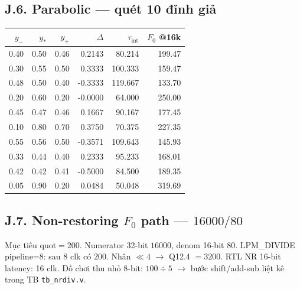 \subsection*{J.6. Parabolic --- quét 10 đỉnh giả}
\begin{center}\scriptsize
\begin{tabular}{@{}rrrrrr@{}}
\toprule
$y_-$ & $y_*$ & $y_+$ & $\Delta$ & $\tau_{\mathrm{int}}$ & $F_0$ @16k \\
\midrule
0.40 & 0.50 & 0.46 & 0.2143 & 80.214 & 199.47 \\
0.30 & 0.55 & 0.50 & 0.3333 & 100.333 & 159.47 \\
0.48 & 0.50 & 0.40 & -0.3333 & 119.667 & 133.70 \\
0.20 & 0.60 & 0.20 & -0.0000 & 64.000 & 250.00 \\
0.45 & 0.47 & 0.46 & 0.1667 & 90.167 & 177.45 \\
0.10 & 0.80 & 0.70 & 0.3750 & 70.375 & 227.35 \\
0.55 & 0.56 & 0.50 & -0.3571 & 109.643 & 145.93 \\
0.33 & 0.44 & 0.40 & 0.2333 & 95.233 & 168.01 \\
0.42 & 0.42 & 0.41 & -0.5000 & 84.500 & 189.35 \\
0.05 & 0.90 & 0.20 & 0.0484 & 50.048 & 319.69 \\
\bottomrule
\end{tabular}
\end{center}

\subsection*{J.7. Non-restoring $F_0$ path --- $16000/80$}
Mục tiêu quot$=200$. Numerator 32-bit $16000$, denom 16-bit $80$. LPM\_DIVIDE pipeline=8: sau 8 clk có $200$. Nhân $\ll4$ $\to$ Q12.4 $=3200$.
RTL NR 16-bit latency: 16 clk. Đồ chơi thu nhỏ 8-bit: $100\div5$ $\to$ bước shift/add-sub liệt kê trong TB \texttt{tb\_nrdiv.v}.

